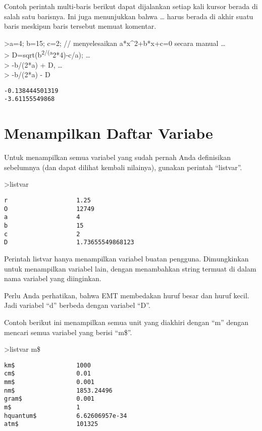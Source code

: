 \documentclass[
]{book}
\begin{document}
Contoh perintah multi-baris berikut dapat dijalankan setiap kali kursor berada di salah satu barisnya. Ini juga menunjukkan bahwa \ldots{} harus berada di akhir suatu baris meskipun baris tersebut memuat komentar.

\textgreater a=4; b=15; c=2; // menyelesaikan a*x\^{}2+b*x+c=0 secara manual \ldots{}\\
\textgreater{} D=sqrt(b\textsuperscript{2/(a}2*4)-c/a); \ldots{}\\
\textgreater{} -b/(2*a) + D, \ldots{}\\
\textgreater{} -b/(2*a) - D

\begin{verbatim}
-0.138444501319
-3.61155549868
\end{verbatim}

\chapter{Menampilkan Daftar Variabe}\label{menampilkan-daftar-variabe}

Untuk menampilkan semua variabel yang sudah pernah Anda definisikan sebelumnya (dan dapat dilihat kembali nilainya), gunakan perintah ``listvar''.

\textgreater listvar

\begin{verbatim}
r                   1.25
O                   12749
a                   4
b                   15
c                   2
D                   1.73655549868123
\end{verbatim}

Perintah listvar hanya menampilkan variabel buatan pengguna. Dimungkinkan untuk menampilkan variabel lain, dengan menambahkan string termuat di dalam nama variabel yang diinginkan.

Perlu Anda perhatikan, bahwa EMT membedakan huruf besar dan huruf kecil. Jadi variabel ``d'' berbeda dengan variabel ``D''.

Contoh berikut ini menampilkan semua unit yang diakhiri dengan ``m'' dengan mencari semua variabel yang berisi ``m\$''.

\textgreater listvar m\$

\begin{verbatim}
km$                 1000
cm$                 0.01
mm$                 0.001
nm$                 1853.24496
gram$               0.001
m$                  1
hquantum$           6.62606957e-34
atm$                101325
\end{verbatim}
\end{document}
